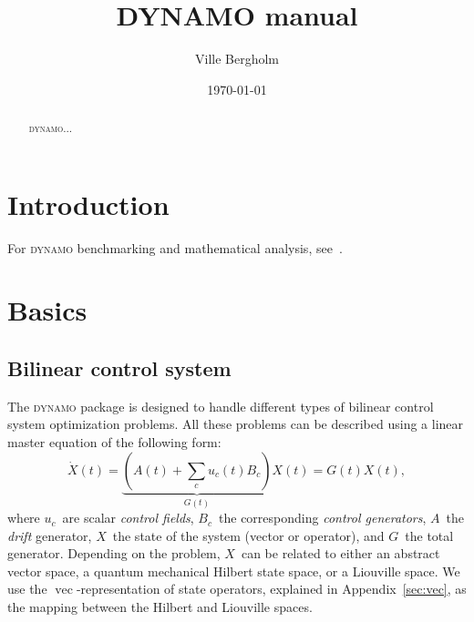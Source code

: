\documentclass[aps, pra, a4paper, longbibliography, superscriptaddress]{revtex4-1}
\newcommand{\be}{\begin{equation}}
\newcommand{\ee}{\end{equation}}
\DeclareMathOperator{\cvec}{vec}
\newcommand{\DYNAMO}{\textsc{dynamo}}
\begin{document}
\title{DYNAMO manual}
\date{\today}

\author{Ville Bergholm}


\begin{abstract}
\DYNAMO{}...
\end{abstract}
\maketitle



\tableofcontents


\section{Introduction}

For \DYNAMO{} benchmarking and mathematical analysis, see~\cite{machnes_2011}.



\section{Basics}

\subsection{Bilinear control system}
The \DYNAMO{} package is designed to handle different types of bilinear
control system optimization problems.
All these problems can be described using a linear master equation of
the following form:
\be
\label{eq:master}
\dot{X}(t) = \underbrace{\left(A(t) +\sum_{c} u_c(t) B_c\right)}_{G(t)} X(t) = G(t) X(t),
\ee
where $u_c$~are scalar \emph{control fields}, $B_c$~the
corresponding \emph{control generators},
$A$~the \emph{drift} generator, $X$~the state of the system (vector or operator),
and $G$~the total generator.
Depending on the problem,
$X$~can be related to either an abstract
vector space, a quantum mechanical Hilbert state space,
or a Liouville space.
We use the $\cvec$-representation of state
operators, explained in Appendix~\ref{sec:vec},
as the mapping between the Hilbert and Liouville spaces.
\end{document}
